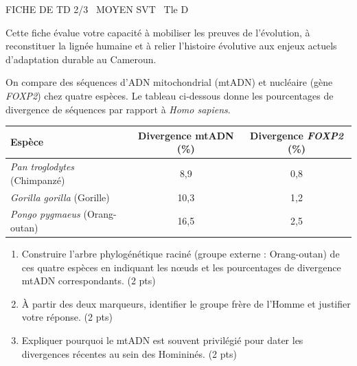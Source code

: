 \documentclass[11pt]{article}
\begin{document}
\begin{tcolorbox}[enhanced,colback=popink,colframe=popink,arc=10pt,boxrule=0pt,left=12pt,right=12pt,top=9pt,bottom=9pt]
{\color{white}\popxbold\small FICHE DE TD 2/3 \textbullet\ MOYEN \hfill SVT \textbullet\ Tle D\par}
\end{tcolorbox}
\vspace{4pt}
Cette fiche évalue votre capacité à mobiliser les preuves de l'évolution, à reconstituer la lignée humaine et à relier l'histoire évolutive aux enjeux actuels d'adaptation durable au Cameroun.

\begin{exercice}
On compare des séquences d'ADN mitochondrial (mtADN) et nucléaire (gène \textit{FOXP2}) chez quatre espèces. Le tableau ci-dessous donne les pourcentages de divergence de séquences par rapport à \textit{Homo sapiens}.

\begin{tabular}{lcc}
\toprule
Espèce & Divergence mtADN (\%) & Divergence \textit{FOXP2} (\%) \\
\midrule
\textit{Pan troglodytes} (Chimpanzé) & 8,9 & 0,8 \\
\textit{Gorilla gorilla} (Gorille) & 10,3 & 1,2 \\
\textit{Pongo pygmaeus} (Orang-outan) & 16,5 & 2,5 \\
\bottomrule
\end{tabular}

\begin{enumerate}
    \item Construire l'arbre phylogénétique raciné (groupe externe : Orang-outan) de ces quatre espèces en indiquant les nœuds et les pourcentages de divergence mtADN correspondants. \hfill (2 pts)
    \item À partir des deux marqueurs, identifier le groupe frère de l'Homme et justifier votre réponse. \hfill (2 pts)
    \item Expliquer pourquoi le mtADN est souvent privilégié pour dater les divergences récentes au sein des Homininés. \hfill (2 pts)
\end{enumerate}
\end{exercice}
\end{document}
